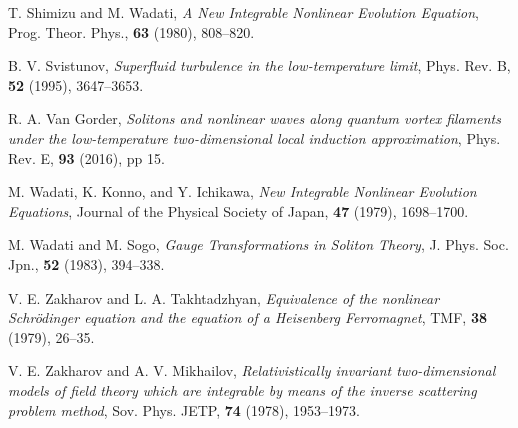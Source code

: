 \documentclass[11pt]{article}
\begin{document}
\begin{thebibliography}{10}
 T. Shimizu and M. Wadati, 
\emph{A New Integrable Nonlinear Evolution Equation}, 
Prog. Theor. Phys., {\bf 63} (1980), 808--820.

 B. V. Svistunov, 
\emph{Superfluid turbulence in the low-temperature limit},
Phys. Rev. B, {\bf 52} (1995), 3647--3653.

 R. A. Van Gorder,
\emph{Solitons and nonlinear waves along quantum vortex filaments under the low-temperature two-dimensional local induction approximation},
Phys. Rev. E, {\bf 93} (2016), pp 15.

 M. Wadati, K. Konno, and Y. Ichikawa,
\emph{New Integrable Nonlinear Evolution Equations}, 
Journal of the Physical Society of Japan, {\bf 47} (1979), 1698--1700.

 M. Wadati and M. Sogo,
\emph{Gauge Transformations in Soliton Theory},
J. Phys. Soc. Jpn., {\bf 52} (1983), 394--338. 

 V. E. Zakharov and L. A. Takhtadzhyan, 
\emph{Equivalence of the nonlinear Schr\"{o}dinger equation and the equation of a Heisenberg Ferromagnet},
TMF, {\bf 38} (1979), 26--35. 

 V. E. Zakharov and A. V. Mikhailov,
\emph{Relativistically invariant two-dimensional models of field theory which are 
integrable by means of the inverse scattering problem method},
Sov. Phys. JETP, {\bf 74} (1978), 1953--1973.



\end{thebibliography}
\end{document}
